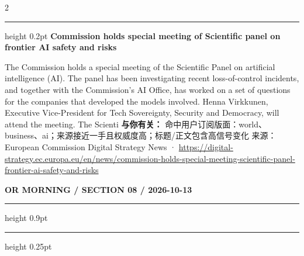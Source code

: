\documentclass[10.5pt]{ctexart}
\begin{document}
\begin{multicols}{2}
\vspace{2mm}
\hrule height 0.2pt
\vspace{2mm}
{\large\bfseries Commission holds special meeting of Scientific panel on frontier AI safety and risks}\par
The Commission holds a special meeting of the Scientific Panel on artificial intelligence (AI). The panel has been investigating recent loss-of-control incidents, and together with the Commission’s AI Office, has worked on a set of questions for the companies that developed the models involved. Henna Virkkunen, Executive Vice-President for Tech Sovereignty, Security and Democracy, will attend the meeting. The Scienti
\textbf{与你有关：} 命中用户订阅版面：world、business、ai；来源接近一手且权威度高；标题/正文包含高信号变化
{\footnotesize\color{ormuted} 来源：European Commission Digital Strategy News · \url{https://digital-strategy.ec.europa.eu/en/news/commission-holds-special-meeting-scientific-panel-frontier-ai-safety-and-risks}}
\end{multicols}
\newpage
{\small\bfseries OR MORNING / SECTION 08 / 2026-10-13}
\vspace{2mm}
\hrule height 0.9pt
\vspace{1.5mm}
\hrule height 0.25pt
\vspace{4mm}
\end{document}
